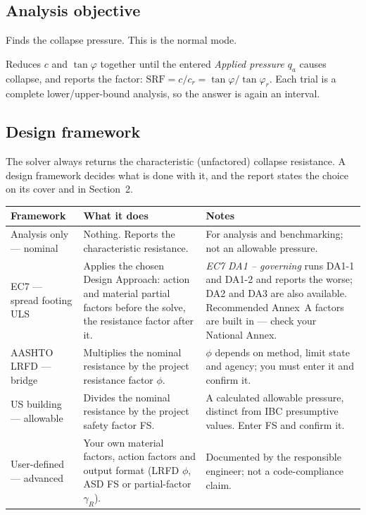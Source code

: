 \documentclass[11pt,a4paper]{article}
\newcommand{\field}[1]{\textsf{\textit{#1}}}
\begin{document}
\subsection{Analysis objective}
\begin{description}[style=nextline]
  \item[Ultimate bearing resistance] Finds the collapse pressure. This is the normal mode.
  \item[Strength-reduction factor (SRF)] Reduces $c$ and $\tan\varphi$ together until the entered \field{Applied pressure $q_a$} causes collapse, and reports the factor: $\mathrm{SRF} = c/c_r = \tan\varphi/\tan\varphi_r$. Each trial is a complete lower/upper-bound analysis, so the answer is again an interval.
\end{description}

\subsection{Design framework}\label{sec:frameworks}
The solver always returns the characteristic (unfactored) collapse resistance. A design framework decides what is done with it, and the report states the choice on its cover and in Section~2.

\begin{longtable}{L{34mm}L{42mm}L{78mm}}
\toprule
\textbf{Framework} & \textbf{What it does} & \textbf{Notes}\\
\midrule
\endhead
Analysis only --- nominal & Nothing. Reports the characteristic resistance. & For analysis and benchmarking; not an allowable pressure.\\
EC7 --- spread footing ULS & Applies the chosen Design Approach: action and material partial factors before the solve, the resistance factor after it. & \field{EC7 DA1 -- governing} runs DA1-1 and DA1-2 and reports the worse; DA2 and DA3 are also available. Recommended Annex~A factors are built in --- check your National Annex.\\
AASHTO LRFD --- bridge & Multiplies the nominal resistance by the project resistance factor $\phi$. & $\phi$ depends on method, limit state and agency; you must enter it and confirm it.\\
US building --- allowable & Divides the nominal resistance by the project safety factor FS. & A calculated allowable pressure, distinct from IBC presumptive values. Enter FS and confirm it.\\
User-defined --- advanced & Your own material factors, action factors and output format (LRFD $\phi$, ASD FS or partial-factor $\gamma_R$). & Documented by the responsible engineer; not a code-compliance claim.\\
\bottomrule
\end{longtable}
\end{document}
